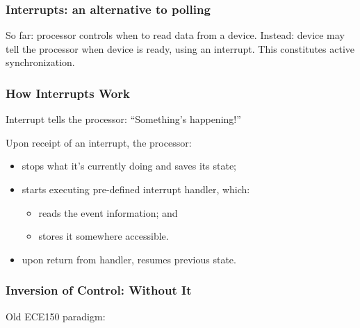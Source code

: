 \documentclass[aspectratio=169]{beamer}
\begin{document}
\begin{frame}
\frametitle{Interrupts: an alternative to polling}

\large
So far: processor controls when to read data from a device.\vfill
Instead: device may tell the processor when device is ready,
using an \alert{interrupt}.\vfill
This constitutes \alert{active synchronization}.
\end{frame}

\begin{frame}
\frametitle{How Interrupts Work}
Interrupt tells the processor: ``Something's happening!''\vfill

Upon receipt of an interrupt, the processor:
\begin{itemize}
\item stops what it's currently doing and saves its state;
\item starts executing pre-defined \alert{interrupt handler}, which:
\begin{itemize}
\item reads the event information; and
\item stores it somewhere accessible.
\end{itemize}
\item upon return from handler, resumes previous state.
\end{itemize}
\end{frame}

\begin{frame}
\frametitle{Inversion of Control: Without It}
Old ECE150 paradigm:\\[2em]

\end{frame}
\end{document}

